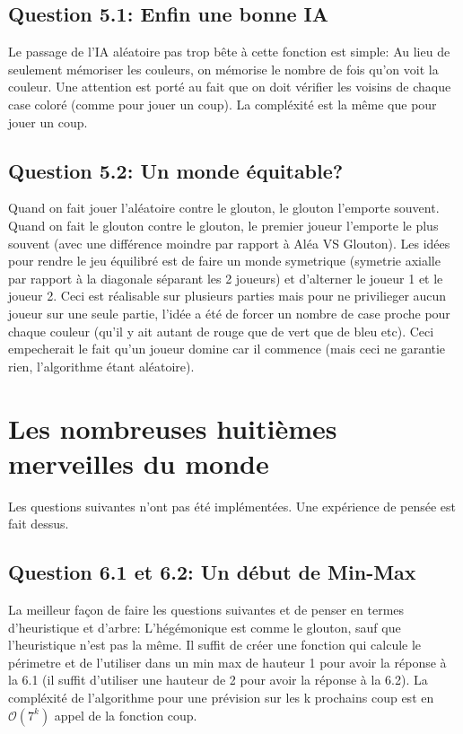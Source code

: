 \documentclass[11pt]{article}
\begin{document}
    \subsection{Question 5.1: Enfin une bonne IA}

    Le passage de l'IA aléatoire pas trop bête à cette fonction est simple: Au lieu de seulement mémoriser les couleurs, on mémorise le nombre de fois qu'on voit la couleur. Une attention est porté au fait que on doit vérifier les voisins de chaque case coloré (comme pour jouer un coup). La compléxité est la même que pour jouer un coup.

    \subsection{Question 5.2: Un monde équitable?}

    Quand on fait jouer l'aléatoire contre le glouton, le glouton l'emporte souvent. Quand on fait le glouton contre le glouton, le premier joueur l'emporte le plus souvent (avec une différence moindre par rapport à Aléa VS Glouton). Les idées pour rendre le jeu équilibré est de faire un monde symetrique (symetrie axialle par rapport à la diagonale séparant les 2 joueurs) et d'alterner le joueur 1 et le joueur 2. Ceci est réalisable sur plusieurs parties mais pour ne privilieger aucun joueur sur une seule partie, l'idée a été de forcer un nombre de case proche pour chaque couleur (qu'il y ait autant de rouge que de vert que de bleu etc). Ceci empecherait le fait qu'un joueur domine car il commence (mais ceci ne garantie rien, l'algorithme étant aléatoire).

    \section{Les nombreuses huitièmes merveilles du monde}

    Les questions suivantes n'ont pas été implémentées. Une expérience de pensée est fait dessus.

    \subsection{Question 6.1 et 6.2: Un début de Min-Max}

    La meilleur façon de faire les questions suivantes et de penser en termes d'heuristique et d'arbre: L'hégémonique est comme le glouton, sauf que l'heuristique n'est pas la même. Il suffit de créer une fonction qui calcule le périmetre et de l'utiliser dans un min max de hauteur 1 pour avoir la réponse à la 6.1 (il suffit d'utiliser une hauteur de 2 pour avoir la réponse à la 6.2). La compléxité de l'algorithme pour une prévision sur les k prochains coup est en $\mathcal{O}(7^k)$ appel de la fonction coup.
\end{document}
